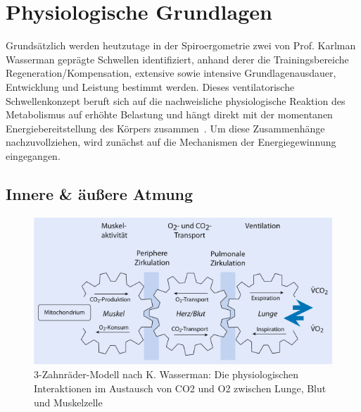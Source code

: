 \section{Physiologische Grundlagen}

Grundsätzlich werden heutzutage in der Spiroergometrie zwei von Prof. Karlman Wasserman geprägte Schwellen identifiziert, anhand derer die Trainingsbereiche Regeneration/Kompensation, extensive sowie intensive Grundlagenausdauer, Entwicklung und Leistung bestimmt werden. Dieses ventilatorische Schwellenkonzept beruft sich auf die nachweisliche physiologische Reaktion des Metabolismus auf erhöhte Belastung und hängt direkt mit der momentanen Energiebereitstellung des Körpers zusammen~\cite{Westhoff.2012}. Um diese Zusammenhänge nachzuvollziehen, wird zunächst auf die Mechanismen der Energiegewinnung eingegangen.

\subsection{Innere \& äußere Atmung}

\begin{figure}[H]
	\centering
	\includegraphics[scale=0.65]{Bilder/zahnraeder.png}
	\caption[3-Zahnräder-Modell mit physiologischen Interaktionen im Gasaustausch]{3-Zahnräder-Modell nach K. Wasserman: Die physiologischen Interaktionen im Austausch von \acs{CO2} und \acs{O2} zwischen Lunge, Blut und Muskelzelle~\cite{Loellgen.2010}}
	\label{pic:pic1}
\end{figure}

